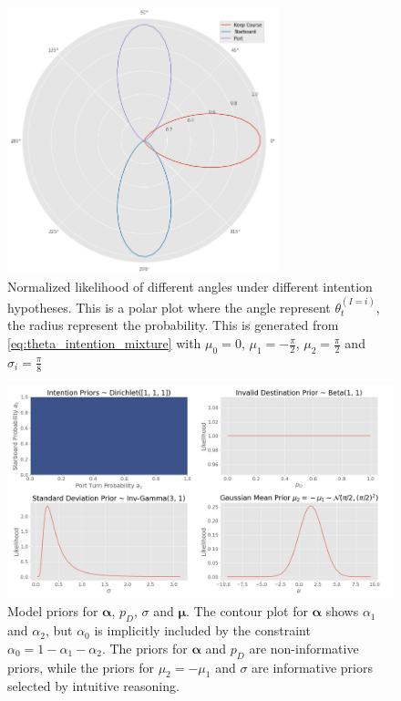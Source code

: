 \begin{figure}
    \centering
    \includegraphics[width=0.7\textwidth]{figures/intention_angle.png}
    \caption{Normalized likelihood of different angles under different intention hypotheses. This is a polar plot where the angle represent $\theta_t^{(I=i)}$, the radius represent the probability. This is generated from \cref{eq:theta_intention_mixture} with $\mu_0=0$, $\mu_1 = -\frac{\pi}{2}$, $\mu_2=\frac{\pi}{2}$ and $\sigma_i=\frac{\pi}{8}$}
    \label{fig:intention_angle}
\end{figure}

\begin{figure}
    \centering
    \includegraphics[width=1\textwidth]{figures/priors.png}
    \caption{Model priors for $\boldsymbol{\alpha}$, $p_D$, $\sigma$ and $\boldsymbol{\mu}$. The contour plot for $\boldsymbol{\alpha}$ shows $\alpha_1$ and $\alpha_2$, but $\alpha_0$ is implicitly included by the constraint $\alpha_0 = 1 - \alpha_1 - \alpha_2$. The priors for $\boldsymbol{\alpha}$ and $p_D$ are non-informative priors, while the priors for $\mu_2 = -\mu_1$ and $\sigma$ are informative priors selected by intuitive reasoning.}
    \label{fig:priors}
\end{figure}


